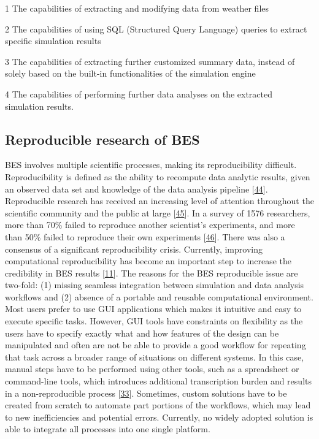 \documentclass[3p, times]{elsarticle} %
\begin{document}
\begin{table}[!h]
\begin{threeparttable}
\begin{tablenotes}
\scriptsize
\item [1] The capabilities of extracting and modifying data from weather files
\item [2] The capabilities of using SQL (Structured Query Language) queries to extract specific simulation results
\item [3] The capabilities of extracting further customized summary data, instead of solely based on the built-in functionalities of the simulation engine
\item [4] The capabilities of performing further data analyses on the extracted simulation results.
\end{tablenotes}
\end{threeparttable}
\end{table}

\hypertarget{reproducible-research-of-bes}{%
\subsection{Reproducible research of BES}\label{reproducible-research-of-bes}}

BES involves multiple scientific processes, making its reproducibility
difficult. Reproducibility is defined as the ability to recompute data analytic
results, given an observed data set and knowledge of the data analysis pipeline
{[}\protect\hyperlink{ref-Peng2015}{44}{]}. Reproducible research has received an increasing level of attention
throughout the scientific community and the public at large {[}\protect\hyperlink{ref-Boettiger2015}{45}{]}. In
a survey of 1576 researchers, more than 70\% failed to reproduce another
scientist's experiments, and more than 50\% failed to reproduce their own
experiments {[}\protect\hyperlink{ref-Baker2016a}{46}{]}. There was also a consensus of a significant
reproducibility crisis. Currently, improving computational reproducibility has
become an important step to increase the credibility in BES results
{[}\protect\hyperlink{ref-Fleming2012}{11}{]}. The reasons for the BES reproducible issue are two-fold: (1)
missing seamless integration between simulation and data analysis workflows and
(2) absence of a portable and reusable computational environment. Most users
prefer to use GUI applications which makes it intuitive and easy to execute
specific tasks. However, GUI tools have constraints on flexibility as the users
have to specify exactly what and how features of the design can be manipulated
and often are not be able to provide a good workflow for repeating that task
across a broader range of situations on different systems. In this case, manual
steps have to be performed using other tools, such as a spreadsheet or
command-line tools, which introduces additional transcription burden and results
in a non-reproducible process {[}\protect\hyperlink{ref-Macumber2012}{33}{]}. Sometimes, custom solutions have
to be created from scratch to automate part portions of the workflows, which may
lead to new inefficiencies and potential errors. Currently, no widely adopted
solution is able to integrate all processes into one single platform.
\end{document}
